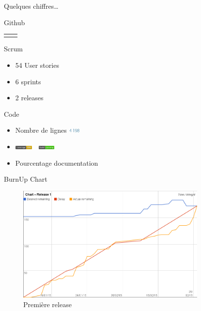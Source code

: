 \documentclass{beamer}
\begin{document}
\begin{frame}{Quelques chiffres\ldots}
\begin{block}{Github}
\begin{tabular}{cc}
\begin{minipage}{0.5\textwidth}
\begin{itemize}
				\end{itemize}
			\end{minipage}
		\end{tabular}
	\end{block}
	\begin{block}{Scrum}
		\begin{itemize}
			\item 54 User stories
			\item 6 sprints
			\item 2 releases
		\end{itemize}
	\end{block}

	\begin{block}{Code}
		\begin{itemize}
			\item Nombre de lignes \includegraphics[height=9px]{images/stats/nblines.jpg}
			\item \includegraphics[height=7px]{images/coverage.png}~~\includegraphics[height=7px]{images/build.png}
			\item Pourcentage documentation
		\end{itemize}
	\end{block}

\end{frame}

\begin{frame}{BurnUp Chart}
	\begin{figure}[H]
		\includegraphics[width=9.5cm]{images/release1Chart.png}
		\caption{Première release}
	\end{figure}
\end{frame}
\end{document}
